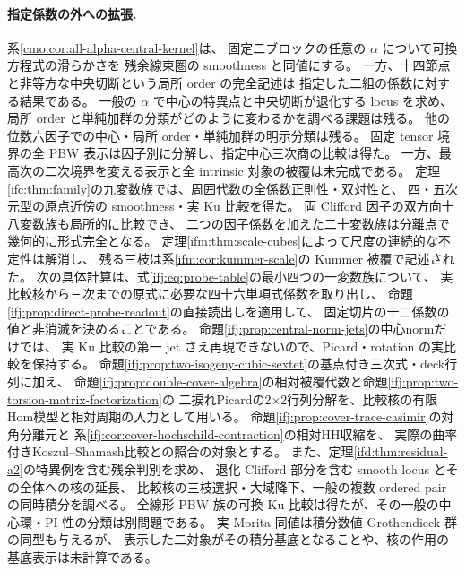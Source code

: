 \paragraph{指定係数の外への拡張.}
系\ref{cmo:cor:all-alpha-central-kernel}は、
固定二ブロックの任意の $\alpha$ について可換方程式の滑らかさを
残余線束圏の smoothness と同値にする。
一方、十四節点と非等方な中央切断という局所 order の完全記述は
指定した二組の係数に対する結果である。
一般の $\alpha$ で中心の特異点と中央切断が退化する locus を求め、
局所 order と単純加群の分類がどのように変わるかを調べる課題は残る。
他の位数六因子での中心・局所 order・単純加群の明示分類は残る。
固定 tensor 境界の全 PBW 表示は因子別に分解し、指定中心三次商の比較は得た。
一方、最高次の二次境界を変える表示と全 intrinsic 対象の被覆は未完成である。
定理\ref{ifc:thm:family}の九変数族では、周囲代数の全係数正則性・双対性と、
四・五次元型の原点近傍の smoothness・実 Ku 比較を得た。
両 Clifford 因子の双方向十八変数族も局所的に比較でき、
二つの因子係数を加えた二十変数族は分離点で幾何的に形式完全となる。
定理\ref{ifm:thm:scale-cubes}によって尺度の連続的な不定性は解消し、
残る三枝は系\ref{ifm:cor:kummer-scale}の Kummer 被覆で記述された。
次の具体計算は、式\eqref{ifj:eq:probe-table}の最小四つの一変数族について、
実比較核から三次までの原式に必要な四十六単項式係数を取り出し、
命題\ref{ifj:prop:direct-probe-readout}の直接読出しを適用して、
固定切片の十二係数の値と非消滅を決めることである。
命題\ref{ifj:prop:central-norm-jets}の中心normだけでは、
実 Ku 比較の第一 jet さえ再現できないので、Picard・rotation の実比較を保持する。
命題\ref{ifj:prop:two-isogeny-cubic-sextet}の基点付き三次式・deck行列に加え、
命題\ref{ifj:prop:double-cover-algebra}の相対被覆代数と命題\ref{ifj:prop:two-torsion-matrix-factorization}の
二捩れPicardの2×2行列分解を、比較核の有限Hom模型と相対周期の入力として用いる。
命題\ref{ifj:prop:cover-trace-casimir}の対角分離元と
系\ref{ifj:cor:cover-hochschild-contraction}の相対HH収縮を、
実際の曲率付きKoszul--Shamash比較との照合の対象とする。
また、定理\ref{ifd:thm:residual-a2}の特異例を含む残余判別を求め、
退化 Clifford 部分を含む smooth locus とその全体への核の延長、
比較核の三枝選択・大域降下、一般の複数 ordered pair の同時積分を調べる。
全線形 PBW 族の可換 Ku 比較は得たが、その一般の中心環・PI 性の分類は別問題である。
実 Morita 同値は積分数値 Grothendieck 群の同型も与えるが、
表示した二対象がその積分基底となることや、核の作用の基底表示は未計算である。



